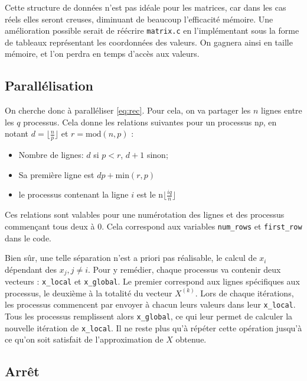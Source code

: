 \documentclass[11pt, a4paper]{article}
\begin{document}
\bigskip
Cette structure de données n'est pas idéale pour les matrices, car dans les cas réels elles seront creuses, diminuant de beaucoup l'efficacité mémoire.
Une amélioration possible serait de réécrire \texttt{matrix.c} en l'implémentant sous la forme de tableaux représentant les coordonnées des valeurs.
On gagnera ainsi en taille mémoire, et l'on perdra en temps d'accès aux valeurs.

\subsection{Parallélisation}

On cherche donc à paralléliser \eqref{eq:rec}.
Pour cela, on va partager les \(n\) lignes entre les \(q\) processus.
Cela donne les relations suivantes pour un processus n\textdegree\(p\), en notant \(d = \lfloor \frac{n}{p} \rfloor\) et \(r = \text{mod}(n,p)\) :
\begin{itemize}
    \item Nombre de lignes:  \(d\) si \(p<r\), \(d+1\) sinon;
    \item Sa première ligne est \(dp+\text{min}(r,p)\)
    \item le processus contenant la ligne \(i\) est le n\textdegree\(\lfloor \frac{iq}{n} \rfloor\)
\end{itemize}
Ces relations sont valables pour une numérotation des lignes et des processus commençant tous deux à 0.
Cela correspond aux variables \lstinline{num_rows} et
\lstinline{first_row} dans le code.

\bigskip

Bien sûr, une telle séparation n'est a priori pas réalisable, le calcul de \(x_i\) dépendant des \(x_j, j \neq i\).
Pour y remédier, chaque processus va contenir deux vecteurs : \lstinline{x_local} et \lstinline{x_global}.
Le premier correspond aux lignes spécifiques aux processus, le deuxième à la totalité du vecteur \(X^{(k)}\).
Lors de chaque itérations, les processus commencent par envoyer à chacun leurs valeurs dans leur \lstinline{x_local}.
Tous les processus remplissent alors \lstinline{x_global}, ce qui leur permet de calculer la nouvelle itération de \lstinline{x_local}.
Il ne reste plus qu'à répéter cette opération jusqu'à ce qu'on soit satisfait de l'approximation de \(X\) obtenue.

\newpage
\subsection{Arrêt}
\end{document}
